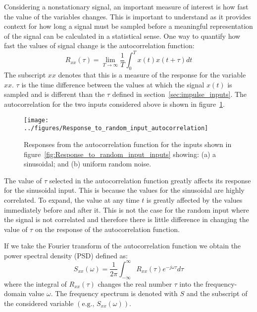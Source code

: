 \documentclass[12pt,letter]{article}
\begin{document}
Considering a nonstationary signal, an important measure of interest is how fast the value of the variables changes. This is important to understand as it provides context for how long a signal must be sampled before a meaningful representation of the signal can be calculated in a statistical sense. One way to quantify how fast the values of signal change is the autocorrelation function: 
\begin{equation}
R_{xx}(\tau) = \lim\limits_{T \rightarrow \infty} \frac{1}{T} \int_{0}^{T}x(t)x(t+\tau)dt
\end{equation}
The subscript $xx$ denotes that this is a measure of the response for the variable $xx$. $\tau$ is the time difference between the values at which the signal $x(t)$ is sampled and is different than the $\tau$ defined in section~\ref{sec:impulse_inputs}. The autocorrelation for the two inputs considered above is shown in figure~\ref{fig:Response_to_random_input_autocorrelation}.
			\vspace{-1ex}
\begin{figure}[H]
	\centering
	\texttt{[image: ../figures/Response\_to\_random\_input\_autocorrelation]}
\vspace{-3ex}
	\caption{Responses from the autocorrelation function for the inputs shown in figure~\ref{fig:Response_to_random_input_inputs} showing: (a) a sinusoidal; and (b) uniform random noise.}
	\label{fig:Response_to_random_input_autocorrelation}
\end{figure} 
\vspace{-2ex}

\begin{note}
 The value of $\tau$ selected in the autocorrelation function greatly affects its response for the sinusoidal input. This is because the values for the sinusoidal are highly correlated. To expand, the value at any time $t$ is greatly affected by the values immediately before and after it. This is not the case for the random input where the signal is not correlated and therefore there is little difference in changing the value of $\tau$ on the response of the autocorrelation function.  
\end{note}

If we take the Fourier transform of the autocorrelation function we obtain the power spectral density (PSD) defined as:
\begin{equation}
S_{xx}(\omega) =\frac{1}{2 \pi} \int_{-\infty}^{\infty} R_{xx}(\tau) e^{-j \omega \tau}d \tau
\end{equation}
where the integral of $R_{xx}(\tau)$ changes the real number $\tau$ into the frequency-domain value $\omega$. The frequency spectrum is denoted with $S$ and the subscript of the considered variable $(\text{e.g., }S_{xx}(\omega))$.  
\end{document}
